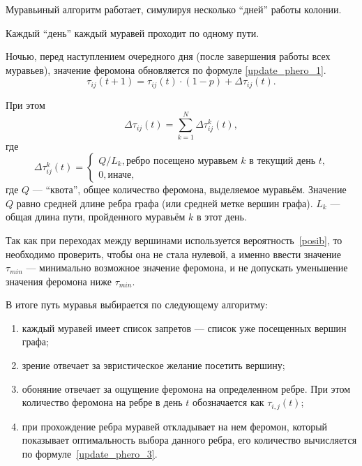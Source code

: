 Муравьиный алгоритм работает, симулируя несколько ``дней'' работы колонии. 

Каждый ``день'' каждый муравей проходит по одному пути.

Ночью, перед наступлением очередного дня (после завершения работы всех муравьев), значение феромона обновляется по формуле \eqref{update_phero_1}.
\begin{equation}
	\label{update_phero_1}
	\tau_{ij}(t+1) = \tau_{ij}(t)\cdot(1-p) + \Delta \tau_{ij}(t).
\end{equation}

При этом
\begin{equation}
	\label{update_phero_2}
	\Delta \tau_{ij}(t) = \sum_{k=1}^N \Delta \tau^k_{ij}(t),
\end{equation}
где
\begin{equation}
	\label{update_phero_3}
	\Delta\tau^k_{ij}(t) = \begin{cases}
		Q/L_{k}, \textrm{ребро посещено муравьем $k$ в текущий день $t$,} \\
		0, \textrm{иначе,}
	\end{cases}
\end{equation}
где $Q$ --- ``квота'', общее количество феромона, выделяемое муравьём. Значение $Q$ равно средней длине ребра графа (или средней метке вершин графа). $L_k$ --- общая длина пути, пройденного муравьём $k$ в этот день.

Так как при переходах между вершинами используется вероятность~\eqref{posib}, то необходимо проверить, чтобы она не стала нулевой, а именно ввести значение $\tau_{min}$ --- минимально возможное значение феромона, и не допускать уменьшение значения феромона ниже $\tau_{min}$.

В итоге путь муравья выбирается по следующему алгоритму:
\begin{enumerate}
	\item каждый муравей имеет список запретов --- список уже посещенных вершин графа;
	\item зрение отвечает за эвристическое желание посетить вершину;
	\item обоняние отвечает за ощущение феромона на определенном ребре. При этом количество феромона на ребре в день $t$ обозначается как $\tau_{i, j} (t)$;
	\item при прохождение ребра муравей откладывает на нем феромон, который показывает оптимальность выбора данного ребра, его количество вычисляется по формуле~\eqref{update_phero_3}.
\end{enumerate}

